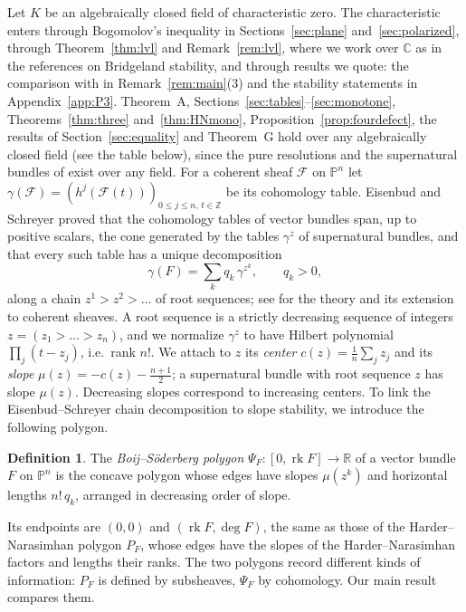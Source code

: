\documentclass[11pt]{amsart}
\theoremstyle{definition}
\newtheorem{definition}[theorem]{Definition}
\theoremstyle{remark}
\newcommand{\PP}{\mathbb{P}}
\newcommand{\RR}{\mathbb{R}}
\newcommand{\ZZ}{\mathbb{Z}}
\newcommand{\cF}{\mathcal{F}}
\DeclareMathOperator{\rk}{rk}
\begin{document}
Let $K$ be an algebraically closed field of characteristic zero. The characteristic enters through Bogomolov's inequality in Sections~\ref{sec:plane} and~\ref{sec:polarized}, through Theorem~\ref{thm:lvl} and Remark~\ref{rem:lvl}, where we work over $\mathbb C$ as in the references on Bridgeland stability, and through results we quote: the comparison with \cite{ErSa16} in Remark~\ref{rem:main}(3) and the stability statements in Appendix~\ref{app:P3}. Theorem~A, Sections~\ref{sec:tables}--\ref{sec:monotone}, Theorems~\ref{thm:three} and~\ref{thm:HNmono}, Proposition~\ref{prop:fourdefect}, the results of Section~\ref{sec:equality} and Theorem~G hold over any algebraically closed field (see the table below), since the pure resolutions and the supernatural bundles of \cite[Thms.~5.1, 6.1]{ES09} exist over any field. For a coherent sheaf $\cF$ on $\PP^n$ let $\gamma(\cF)=(h^j(\cF(t)))_{0\le j\le n,\,t\in\ZZ}$ be its cohomology table. Eisenbud and Schreyer \cite{ES09} proved that the cohomology tables of vector bundles span, up to positive scalars, the cone generated by the tables $\gamma^z$ of supernatural bundles, and that every such table has a unique decomposition
\[
\gamma(F)=\sum_kq_k\,\gamma^{z^k},\qquad q_k>0,
\]
along a chain $z^1>z^2>\dots$ of root sequences; see \cite{ES10,ESi,Fl12} for the theory and its extension to coherent sheaves. A root sequence is a strictly decreasing sequence of integers $z=(z_1>\dots>z_n)$, and we normalize $\gamma^z$ to have Hilbert polynomial $\prod_j(t-z_j)$, i.e.\ rank $n!$. We attach to $z$ its \emph{center} $c(z)=\frac1n\sum_jz_j$ and its \emph{slope} $\mu(z)=-c(z)-\frac{n+1}2$; a supernatural bundle with root sequence $z$ has slope $\mu(z)$. Decreasing slopes correspond to increasing centers. To link the Eisenbud--Schreyer chain decomposition to slope stability, we introduce the following polygon.

\begin{definition}
The \emph{Boij--Söderberg polygon} $\Psi_F\colon[0,\rk F]\to\RR$ of a vector bundle $F$ on $\PP^n$ is the concave polygon whose edges have slopes $\mu(z^k)$ and horizontal lengths $n!\,q_k$, arranged in decreasing order of slope.
\end{definition}

Its endpoints are $(0,0)$ and $(\rk F,\deg F)$, the same as those of the Harder--Narasimhan polygon $P_F$, whose edges have the slopes of the Harder--Narasimhan factors and lengths their ranks. The two polygons record different kinds of information: $P_F$ is defined by subsheaves, $\Psi_F$ by cohomology. Our main result compares them.
\end{document}
